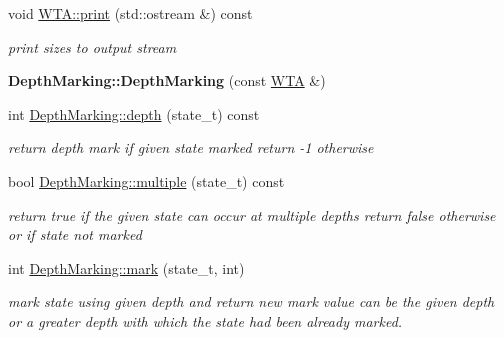 \begin{DoxyCompactItemize}
void \mbox{\hyperlink{group__schemata_gaeb713b8807bc81c6c6519ced5d531e06}{W\+T\+A\+::print}} (std\+::ostream \&) const
\begin{DoxyCompactList}\small\item\em print sizes to output stream \end{DoxyCompactList}\item 
\mbox{\label{group__schemata_gaf0a0a9f458a39032b2c653a99f609935}} 
{\bfseries Depth\+Marking\+::\+Depth\+Marking} (const \mbox{\hyperlink{classWTA}{W\+TA}} \&)
\item 
\mbox{\label{group__schemata_gaaa84e1d149651938af82e47b91888017}} 
int \mbox{\hyperlink{group__schemata_gaaa84e1d149651938af82e47b91888017}{Depth\+Marking\+::depth}} (state\+\_\+t) const
\begin{DoxyCompactList}\small\item\em return depth mark if given state marked return -\/1 otherwise \end{DoxyCompactList}\item 
\mbox{\label{group__schemata_gad5f3fa885bb5d2be624a26e9aa50dd0b}} 
bool \mbox{\hyperlink{group__schemata_gad5f3fa885bb5d2be624a26e9aa50dd0b}{Depth\+Marking\+::multiple}} (state\+\_\+t) const
\begin{DoxyCompactList}\small\item\em return true if the given state can occur at multiple depths return false otherwise or if state not marked \end{DoxyCompactList}\item 
\mbox{\label{group__schemata_ga3486fcb9921f3c018b931e088a53df7d}} 
int \mbox{\hyperlink{group__schemata_ga3486fcb9921f3c018b931e088a53df7d}{Depth\+Marking\+::mark}} (state\+\_\+t, int)
\begin{DoxyCompactList}\small\item\em mark state using given depth and return new mark value can be the given depth or a greater depth with which the state had been already marked. \end{DoxyCompactList}\end{DoxyCompactItemize}
